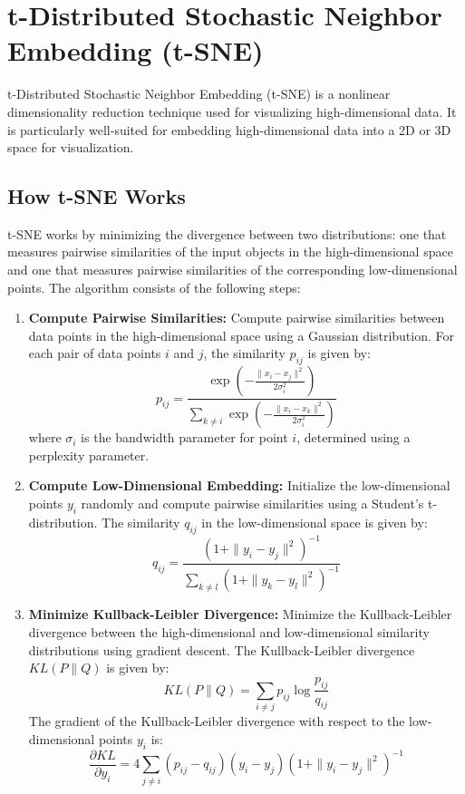 \documentclass{article}
\begin{document}
\section{t-Distributed Stochastic Neighbor Embedding (t-SNE)}
t-Distributed Stochastic Neighbor Embedding (t-SNE) is a nonlinear dimensionality reduction technique used for visualizing high-dimensional data. It is particularly well-suited for embedding high-dimensional data into a 2D or 3D space for visualization.

\subsection{How t-SNE Works}
t-SNE works by minimizing the divergence between two distributions: one that measures pairwise similarities of the input objects in the high-dimensional space and one that measures pairwise similarities of the corresponding low-dimensional points. The algorithm consists of the following steps:
\begin{enumerate}
    \item \textbf{Compute Pairwise Similarities:} Compute pairwise similarities between data points in the high-dimensional space using a Gaussian distribution. For each pair of data points \(i\) and \(j\), the similarity \(p_{ij}\) is given by:
    \[
    p_{ij} = \frac{\exp\left(-\frac{\|x_i - x_j\|^2}{2\sigma_i^2}\right)}{\sum_{k \neq i} \exp\left(-\frac{\|x_i - x_k\|^2}{2\sigma_i^2}\right)}
    \]
    where \(\sigma_i\) is the bandwidth parameter for point \(i\), determined using a perplexity parameter.

    \item \textbf{Compute Low-Dimensional Embedding:} Initialize the low-dimensional points \(y_i\) randomly and compute pairwise similarities using a Student's t-distribution. The similarity \(q_{ij}\) in the low-dimensional space is given by:
    \[
    q_{ij} = \frac{\left(1 + \|y_i - y_j\|^2\right)^{-1}}{\sum_{k \neq l} \left(1 + \|y_k - y_l\|^2\right)^{-1}}
    \]

    \item \textbf{Minimize Kullback-Leibler Divergence:} Minimize the Kullback-Leibler divergence between the high-dimensional and low-dimensional similarity distributions using gradient descent. The Kullback-Leibler divergence \(KL(P \| Q)\) is given by:
    \[
    KL(P \| Q) = \sum_{i \neq j} p_{ij} \log \frac{p_{ij}}{q_{ij}}
    \]
    The gradient of the Kullback-Leibler divergence with respect to the low-dimensional points \(y_i\) is:
    \[
    \frac{\partial KL}{\partial y_i} = 4 \sum_{j \neq i} \left(p_{ij} - q_{ij}\right) \left(y_i - y_j\right) \left(1 + \|y_i - y_j\|^2\right)^{-1}
    \]
\end{enumerate}
\end{document}
